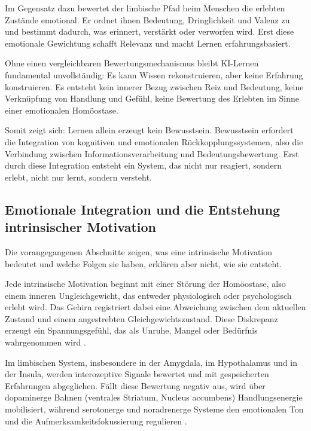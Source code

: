 Im Gegensatz dazu bewertet der limbische Pfad beim Menschen die erlebten Zustände emotional. 
Er ordnet ihnen Bedeutung, Dringlichkeit und Valenz zu und bestimmt dadurch, was erinnert, verstärkt oder verworfen wird. 
Erst diese emotionale Gewichtung schafft Relevanz und macht Lernen erfahrungsbasiert.

Ohne einen vergleichbaren Bewertungsmechanismus bleibt KI-Lernen fundamental unvollständig: 
Es kann Wissen rekonstruieren, aber keine Erfahrung konstruieren. 
Es entsteht kein innerer Bezug zwischen Reiz und Bedeutung, keine Verknüpfung von Handlung und Gefühl, keine Bewertung des Erlebten im Sinne einer emotionalen Homöostase.

Somit zeigt sich: Lernen allein erzeugt kein Bewusstsein. 
Bewusstsein erfordert die Integration von kognitiven und emotionalen Rückkopplungssystemen, also die Verbindung zwischen Informationsverarbeitung und Bedeutungsbewertung. Erst durch diese Integration entsteht ein System, das nicht nur reagiert, sondern erlebt, nicht nur lernt, sondern versteht.


\subsection*{Emotionale Integration und die Entstehung intrinsischer Motivation}

Die vorangegangenen Abschnitte zeigen, was eine intrinsische Motivation bedeutet und welche Folgen sie haben, erklären aber nicht, wie sie entsteht.

Jede intrinsische Motivation beginnt mit einer Störung der Homöostase, also einem inneren Ungleichgewicht, das entweder physiologisch oder psychologisch erlebt wird. Das Gehirn registriert dabei eine Abweichung zwischen dem aktuellen Zustand und einem angestrebten Gleichgewichtszustand. Diese Diskrepanz erzeugt ein Spannungsgefühl, das als Unruhe, Mangel oder Bedürfnis wahrgenommen wird \cite{Friston2010, CarverScheier1998}.

Im limbischen System, insbesondere in der Amygdala, im Hypothalamus und in der Insula, werden interozeptive Signale bewertet und mit gespeicherten Erfahrungen abgeglichen. Fällt diese Bewertung negativ aus, wird über dopaminerge Bahnen (ventrales Striatum, Nucleus accumbens) Handlungsenergie mobilisiert, während serotonerge und noradrenerge Systeme den emotionalen Ton und die Aufmerksamkeitsfokussierung regulieren \cite{LeDoux1996, Panksepp1998}.

